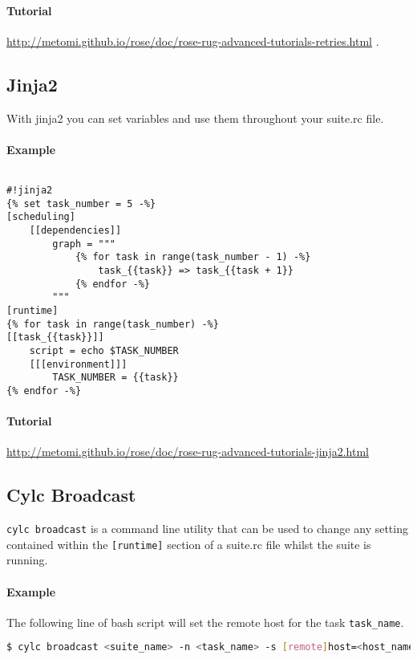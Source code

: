 \paragraph*{Tutorial}
\url{http://metomi.github.io/rose/doc/rose-rug-advanced-tutorials-retries.html}
.


\subsection{Jinja2}

With jinja2 you can set variables and use them throughout your suite.rc file.

\paragraph{Example} $ $

\begin{lstlisting}
#!jinja2
{% set task_number = 5 -%}
[scheduling]
    [[dependencies]]
        graph = """
            {% for task in range(task_number - 1) -%}
                task_{{task}} => task_{{task + 1}}
            {% endfor -%}
        """
[runtime]
{% for task in range(task_number) -%}
[[task_{{task}}]]
    script = echo $TASK_NUMBER
    [[[environment]]]
        TASK_NUMBER = {{task}}
{% endfor -%}
\end{lstlisting}

\paragraph*{Tutorial}
\url{http://metomi.github.io/rose/doc/rose-rug-advanced-tutorials-jinja2.html}


\subsection{Cylc Broadcast}

\lstinline[language=bash]{cylc broadcast} is a command line utility that can
be used to change any setting contained within the \lstinline{[runtime]}
section of a suite.rc file whilst the suite is running.

\paragraph*{Example} The following line of bash script will set the remote
host for the task \lstinline{task_name}.

\begin{lstlisting}[language=bash]
$ cylc broadcast <suite_name> -n <task_name> -s [remote]host=<host_name>
\end{lstlisting}

